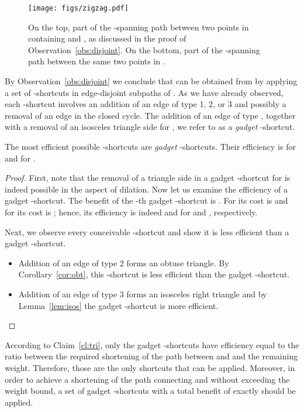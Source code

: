 \documentclass[a4paper]{llncs}
\newcommand{\smallt}{}
\newcommand{\bigt}{}
\begin{document}
\begin{figure}[htb]
    \centering
        \texttt{[image: figs/zigzag.pdf]}
    \caption{On the top, part of the -spanning path between two points in  
    				containing  and , as discussed in the proof of Observation~\ref{obs:disjoint}.
    				On the bottom, part of the -spanning path between the same two points in .}
    \label{fig:zigzag}
\end{figure}

By Observation~\ref{obs:disjoint} we conclude that  can be obtained from  by applying 
a set of -shortcuts in edge-disjoint subpaths of .
As we have already observed, each -shortcut involves an addition of an edge of type 1, 2, or 3
and possibly a removal of an edge in the closed cycle. 
The addition of an edge of type , together with a removal of an isosceles triangle side
for \bigt{}, we refer to as a \emph{gadget} -shortcut.

\begin{myclaim}\label{cl:tri}
The most efficient possible -shortcuts are \emph{gadget} -shortcuts. 
Their efficiency is  for  \smallt{} and  for \bigt{}.
\end{myclaim}

\begin{proof}
First, note that the removal of a triangle side in a gadget -shortcut for \bigt{}
is indeed possible in the aspect of dilation.
Now let us examine the efficiency of a gadget -shortcut.
The benefit of the -th gadget -shortcut is .
For \smallt{} its cost is  and for \bigt{} its cost is ; 
hence, its efficiency is indeed  and  for \smallt{} and \bigt{}, respectively.

Next, we observe every conceivable -shortcut and show it is less efficient than a gadget -shortcut.

\begin{itemize}

\item Addition of an edge of type 2 forms an obtuse triangle.
By Corollary~\ref{cor:obt}, this -shortcut is less efficient than the gadget -shortcut.

\item Addition of an edge of type 3 forms an isosceles right triangle 
and by Lemma~\ref{lem:isos} the gadget -shortcut is more efficient.

\end{itemize}
\end{proof}


According to Claim~\ref{cl:tri}, only the gadget -shortcuts have efficiency equal to
the ratio between the required shortening of the path between  and  and the remaining weight.
Therefore, those are the only shortcuts that can be applied.
Moreover, in order to achieve a  shortening of the path connecting  and 
without exceeding the weight bound, a set of gadget -shortcuts 
with a total benefit of exactly  should be applied. 
\end{document}
